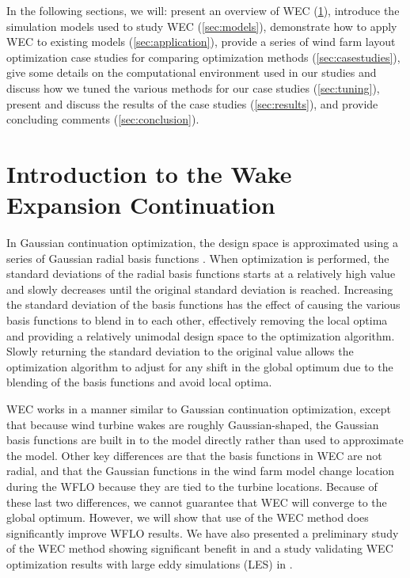 \documentclass{jpconf}
\begin{document}
In the following sections, we will: present an overview of WEC (\cref{sec:introwec}), introduce the simulation models used to study WEC (\cref{sec:models}), demonstrate how to apply WEC to existing models (\cref{sec:application}), provide a series of wind farm layout optimization case studies for comparing optimization methods (\cref{sec:casestudies}), give some details on the computational environment used in our studies and discuss how we tuned the various methods for our case studies (\cref{sec:tuning}), present and discuss the results of the case studies (\cref{sec:results}), and provide concluding comments (\cref{sec:conclusion}).

\section{Introduction to the Wake Expansion Continuation}\label{sec:introwec}

In Gaussian continuation optimization, the design space is approximated using a series of Gaussian radial basis functions \cite{mobahi2015}. When optimization is performed, the standard deviations of the radial basis functions starts at a relatively high value and slowly decreases until the original standard deviation is reached. Increasing the standard deviation of the basis functions has the effect of causing the various basis functions to blend in to each other, effectively removing the local optima and providing a relatively unimodal design space to the optimization algorithm. Slowly returning the standard deviation to the original value allows the optimization algorithm to adjust for any shift in the global optimum due to the blending of the basis functions and avoid local optima. 

WEC works in a manner similar to Gaussian continuation optimization, except that because wind turbine wakes are roughly Gaussian-shaped, the Gaussian basis functions are built in to the model directly rather than used to approximate the model. Other key differences are that the basis functions in WEC are not radial, and that the Gaussian functions in the wind farm model change location during the WFLO because they are tied to the turbine locations. Because of these last two differences, we cannot guarantee that WEC will converge to the global optimum. However, we will show that use of the WEC method does significantly improve WFLO results. We have also presented a preliminary study of the WEC method showing significant benefit in \cite{thomas2018-wec} and a study validating WEC optimization results with large eddy simulations (LES) in \cite{thomas2019-les-validation}.
\end{document}
